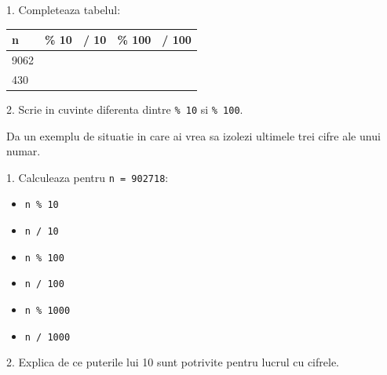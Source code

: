 \newpage
{}

\begin{solobox}
  1. Completeaza tabelul:
  \begin{center}
  \begin{tabularx}{\linewidth}{|X|X|X|X|X|}
    \hline
    \textbf{n} & \textbf{\% 10} & \textbf{/ 10} & \textbf{\% 100} & \textbf{/ 100} \\
    \hline
    9062 & & & & \\
    \hline
    430 & & & & \\
    \hline
  \end{tabularx}
  \end{center}

  2. Scrie in cuvinte diferenta dintre \texttt{\% 10} si \texttt{\% 100}.
\end{solobox}

\begin{solobox}
  Da un exemplu de situatie in care ai vrea sa izolezi ultimele trei cifre ale unui numar.
\end{solobox}

\newpage
{}

\begin{solobox}
  1. Calculeaza pentru \texttt{n = 902718}:
  \begin{itemize}
    \item \texttt{n \% 10}
    \item \texttt{n / 10}
    \item \texttt{n \% 100}
    \item \texttt{n / 100}
    \item \texttt{n \% 1000}
    \item \texttt{n / 1000}
  \end{itemize}

  2. Explica de ce puterile lui 10 sunt potrivite pentru lucrul cu cifrele.
\end{solobox}
